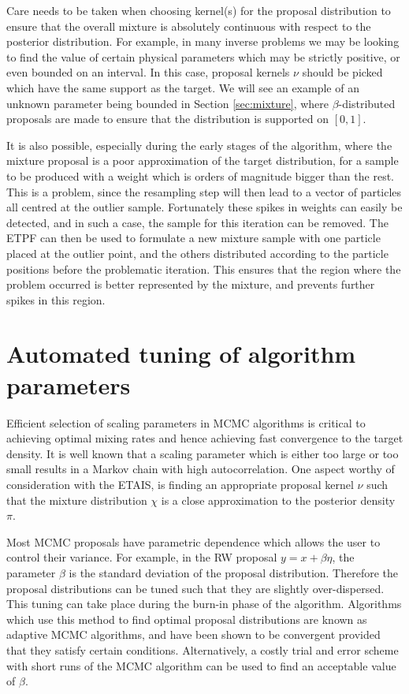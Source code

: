 \documentclass[final]{siamltex}
\begin{document}
Care needs to be taken when choosing kernel(s) for the proposal distribution to
ensure that the overall mixture is absolutely continuous with respect to
the posterior distribution. {\red For example, in many inverse problems we
may be looking to find the value of certain physical parameters which
may be strictly positive, or even bounded on an interval. In
this case, proposal kernels $\nu$ should be picked which have the same
support as the target. We will see an example of an unknown parameter
being bounded in Section \ref{sec:mixture}, where
$\beta$-distributed proposals are made to ensure that the distribution
is supported on $[0,1]$.}


It is also possible, especially during the early stages of the
algorithm, where the mixture proposal is a poor approximation of the
target distribution, for a sample to be produced with a weight which
is orders of magnitude bigger than the rest. This is a problem, since
the resampling step will then lead to a vector of particles all
centred at the outlier sample. Fortunately these spikes in weights can
easily be detected, and in such a case, the sample for this iteration
can be removed. The ETPF can then be used to formulate a new mixture
sample with one particle placed at the outlier point, and the others
distributed according to the particle positions before the problematic
iteration. This ensures that the region where the problem occurred is
better represented by the mixture, and prevents further spikes in this region.


\section{Automated tuning of algorithm parameters}\label{Sec:adapt}

Efficient selection of scaling parameters in MCMC algorithms is
critical to achieving optimal mixing rates and hence achieving fast
convergence to the target density. It is well known that a scaling
parameter which is either too large or too small results in a Markov
chain with high autocorrelation. One aspect worthy of consideration
with the ETAIS, is finding an appropriate proposal kernel $\nu$ such
that the mixture distribution $\chi$ is a close approximation to the
posterior density $\pi$.

Most MCMC proposals have parametric dependence which
allows the user to control their variance. For example, in the RW
proposal $y = x + \beta \eta$, the parameter $\beta$ is the standard deviation
of the proposal distribution. Therefore the proposal distributions can
be tuned such that they are slightly over-dispersed. This tuning
can take place during the burn-in phase of the algorithm. Algorithms
which use this method to find optimal proposal distributions are known
as adaptive MCMC algorithms, and have been shown to be convergent
provided that they satisfy certain
conditions\cite{roberts2007coupling,roberts2009examples}.
Alternatively, a costly trial and error scheme with short runs of the
MCMC algorithm can be used to find an acceptable value of $\beta$.
\end{document}
